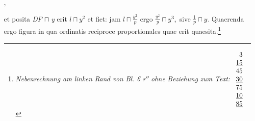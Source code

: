                      ,\rule[-1cm]{0cm}{0cm} et posita \textit{DF} $\sqcap$ \textit{y} erit $ l \sqcap y^2$ et fiet: jam $\displaystyle l \sqcap \frac{y^2}{p}$ ergo $\displaystyle \frac{y^2}{p}\sqcap y^3,$ sive $\displaystyle \frac{1}{p}\sqcap y$. Quaerenda ergo figura in qua  ordinatis reciproce proportionales quae erit quaesita.\footnote{
                 \textit{Nebenrechnung am linken Rand von Bl. 6 r\textsuperscript{o} ohne Beziehung zum Text:} \newline$\protect\begin{array}{r}3\\\protect\underline{15}\\45\\\protect\underline{30}\\75\\\protect\underline{10}\\\protect\underline{85}\protect\end{array}$}
                 \pend 